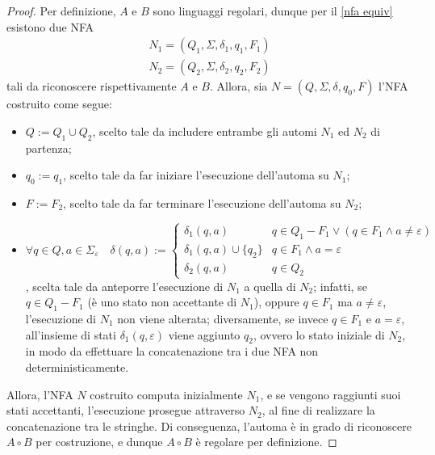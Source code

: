 \documentclass[a4paper, 12pt]{report}
\begin{document}
    \begin{proof}
        Per definizione, $A$ e $B$ sono linguaggi regolari, dunque per il \cref{nfa equiv} esistono due NFA $$\left. \begin{array}{c}N_1 = (Q_1, \Sigma, \delta_1, q_1, F_1) \\ N_2 = (Q_2, \Sigma, \delta_2, q_2, F_2) \end{array} \right.$$ tali da riconoscere rispettivamente $A$ e $B$. Allora, sia $N = (Q, \Sigma, \delta, q_0, F)$ l'NFA costruito come segue:
        
        \begin{itemize}
            \item $Q := Q_1 \cup Q_2$, scelto tale da includere entrambe gli automi $N_1$ ed $N_2$ di partenza;
            \item $q_0 := q_1$, scelto tale da far iniziare l'esecuzione dell'automa su $N_1$;
            \item $F := F_2$, scelto tale da far terminare l'esecuzione dell'automa su $N_2$;
            \item $\forall q \in Q, a \in \Sigma_\varepsilon \quad \delta(q, a) := \left \{ \begin{array}{ll} \delta_1(q, a) & q \in Q_1 - F_1 \lor (q \in F_1 \land a \neq \varepsilon) \\ \delta_1(q, a) \cup \{q_2\} & q \in F_1 \land a = \varepsilon \\ \delta_2(q, a) & q \in Q_2 \end{array} \right.$, scelta tale da anteporre l'esecuzione di $N_1$ a quella di $N_2$; infatti, se $q \in Q_1 - F_1$ (è uno stato non accettante di $N_1$), oppure $q \in F_1$ ma $a \neq \varepsilon$, l'esecuzione di $N_1$ non viene alterata; diversamente, se invece $q \in F_1$ e $a = \varepsilon$, all'insieme di stati $\delta_1(q, \varepsilon)$ viene aggiunto $q_2$, ovvero lo stato iniziale di $N_2$, in modo da effettuare la concatenazione tra i due NFA non deterministicamente.
        \end{itemize}

        Allora, l'NFA $N$ costruito computa inizialmente $N_1$, e se vengono raggiunti suoi stati accettanti, l'esecuzione prosegue attraverso $N_2$, al fine di realizzare la concatenazione tra le stringhe. Di conseguenza, l'automa è in grado di riconoscere $A \circ B$ per costruzione, e dunque $A \circ B$ è regolare per definizione.


\end{proof}
\end{document}
